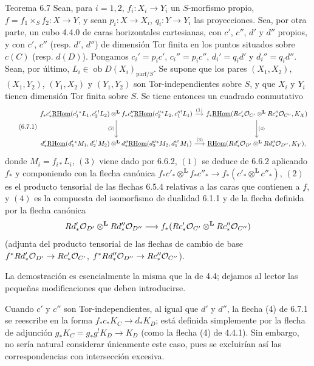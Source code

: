 \begin{statement}{Teorema 6.7}
Sean, para $i=1,2$, $f_i:X_i\to Y_i$ un $S$-morfismo propio, $f=f_1\times_Sf_2:X\to Y$, y sean $p_i:X\to X_i$, $q_i:Y\to Y_i$ las proyecciones. Sea, por otra parte, un cubo 4.4.0 de caras horizontales cartesianas, con $c'$, $c''$, $d'$ y $d''$ propios, y con $c'$, $c''$ (resp. $d'$, $d''$) de dimensión Tor finita en los puntos situados sobre $c(C)$ (resp. $d(D)$). Pongamos $c_i'=p_ic'$, $c_i''=p_ic''$, $d_i'=q_id'$ y $d_i''=q_id''$. Sean, por último, $L_i\in\operatorname{ob}D(X_i)_{\mathrm{parf}/S}$. Se supone que los pares $(X_1,X_2)$, $(X_1,Y_2)$, $(Y_1,X_2)$ y $(Y_1,Y_2)$ son Tor-independientes sobre $S$, y que $X_i$ y $Y_i$ tienen dimensión Tor finita sobre $S$. Se tiene entonces un cuadrado conmutativo
\begin{equation}
\tag{6.7.1}
\begin{tikzcd}[column sep=small,row sep=large]
f_*c'_*\uRHom(c_1'{}^*L_1,c_2'{}^!L_2)\otimes^{\mathbf L} f_*c''_*\uRHom(c_2''{}^*L_2,c_1''{}^!L_1) \arrow[r,"(1)"] \arrow[d,"(2)"']
& f_*\uRHom(Rc'_*\cO_{C'}\otimes^{\mathbf L}Rc''_*\cO_{C''},K_X) \arrow[d,"(4)"] \\
d'_*\uRHom(d_1'{}^*M_1,d_2'{}^!M_2)\otimes^{\mathbf L} d''_*\uRHom(d_2''{}^*M_2,d_1''{}^!M_1) \arrow[r,"(3)"]
& \uRHom(Rd'_*\cO_{D'}\otimes^{\mathbf L}Rd''_*\cO_{D''},K_Y),
\end{tikzcd}
\end{equation}
donde $M_i=f_{i*}L_i$, $(3)$ viene dado por 6.6.2, $(1)$ se deduce de 6.6.2 aplicando $f_*$ y componiendo con la flecha canónica $f_*c'_*\otimes^{\mathbf L} f_*c''_*\to f_*(c'_*\otimes^{\mathbf L} c''_*)$, $(2)$ es el producto tensorial de las flechas 6.5.4 relativas a las caras que contienen a $f$, y $(4)$ es la compuesta del isomorfismo de dualidad 6.1.1 y de la flecha definida por la flecha canónica
\[
Rd'_*\mathcal{O}_{D'}\otimes^{\mathbf L}Rd''_*\mathcal{O}_{D''}\longrightarrow f_*(Rc'_*\mathcal{O}_{C'}\otimes^{\mathbf L}Rc''_*\mathcal{O}_{C''})
\]
(adjunta del producto tensorial de las flechas de cambio de base $f^*Rd'_*\mathcal{O}_{D'}\to Rc'_*\mathcal{O}_{C'}$, $f^*Rd''_*\mathcal{O}_{D''}\to Rc''_*\mathcal{O}_{C''}$).
\end{statement}

La demostración es esencialmente la misma que la de 4.4; dejamos al lector las pequeñas modificaciones que deben introducirse.

Cuando $c'$ y $c''$ son Tor-independientes, al igual que $d'$ y $d''$, la flecha (4) de 6.7.1 se reescribe en la forma $f_*c_*K_C\to d_*K_D$; está definida simplemente por la flecha de adjunción $g_*K_C=g_*g^!K_D\to K_D$ (como la flecha (4) de 4.4.1). Sin embargo, no sería natural considerar únicamente este caso, pues se excluirían así las correspondencias con intersección excesiva.


